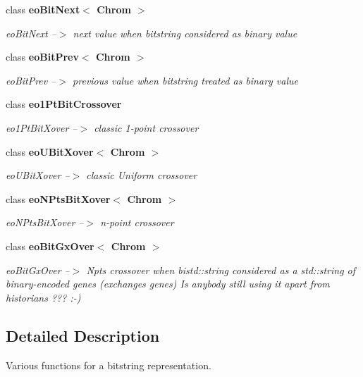 \begin{CompactItemize}
class {\bf eo\-Bit\-Next$<$ Chrom $>$}
\begin{CompactList}\small\item\em eo\-Bit\-Next --$>$ next value when bitstring considered as binary value \item\end{CompactList}\item 
class {\bf eo\-Bit\-Prev$<$ Chrom $>$}
\begin{CompactList}\small\item\em eo\-Bit\-Prev --$>$ previous value when bitstring treated as binary value \item\end{CompactList}\item 
class {\bf eo1Pt\-Bit\-Crossover}
\begin{CompactList}\small\item\em eo1Pt\-Bit\-Xover --$>$ classic 1-point crossover \item\end{CompactList}\item 
class {\bf eo\-UBit\-Xover$<$ Chrom $>$}
\begin{CompactList}\small\item\em eo\-UBit\-Xover --$>$ classic Uniform crossover \item\end{CompactList}\item 
class {\bf eo\-NPts\-Bit\-Xover$<$ Chrom $>$}
\begin{CompactList}\small\item\em eo\-NPts\-Bit\-Xover --$>$ n-point crossover \item\end{CompactList}\item 
class {\bf eo\-Bit\-Gx\-Over$<$ Chrom $>$}
\begin{CompactList}\small\item\em eo\-Bit\-Gx\-Over --$>$ Npts crossover when bistd::string considered as a std::string of binary-encoded genes (exchanges genes) Is anybody still using it apart from historians ??? :-) \item\end{CompactList}\end{CompactItemize}


\subsection{Detailed Description}
Various functions for a bitstring representation. 

